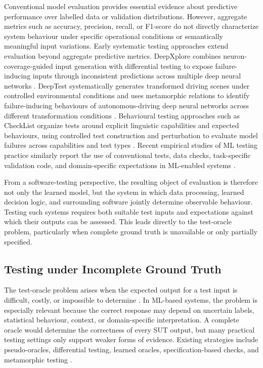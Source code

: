 \documentclass[preprint,12pt]{elsarticle}
\begin{document}
Conventional model evaluation provides essential evidence about predictive
performance over labelled data or validation distributions. However, aggregate
metrics such as accuracy, precision, recall, or F1-score do not directly
characterize system behaviour under specific operational conditions or
semantically meaningful input variations. Early systematic testing approaches
extend evaluation beyond aggregate predictive metrics. DeepXplore combines
neuron-coverage-guided input generation with differential testing to expose
failure-inducing inputs through inconsistent predictions across multiple deep
neural networks \cite{pei2017deepxplore}. DeepTest systematically generates
transformed driving scenes under controlled environmental conditions and uses
metamorphic relations to identify failure-inducing behaviours of
autonomous-driving deep neural networks across different transformation
conditions \cite{tian2018deeptest}. Behavioural testing approaches such as
CheckList organize tests around explicit linguistic capabilities and expected
behaviours, using controlled test construction and perturbation to evaluate
model failures across capabilities and test types
\cite{ribeiro2020checklist}. Recent empirical studies of ML testing practice
similarly report the use of conventional tests, data checks, task-specific
validation code, and domain-specific expectations in ML-enabled systems
\cite{openja2024mlTestingWild,cannavale2026mlTestingPractice}.

From a software-testing perspective, the resulting object of evaluation is
therefore not only the learned model, but the system in which data processing,
learned decision logic, and surrounding software jointly determine observable
behaviour. Testing such systems requires both suitable test inputs and
expectations against which their outputs can be assessed. This leads directly
to the test-oracle problem, particularly when complete ground truth is
unavailable or only partially specified.


\subsection{Testing under Incomplete Ground Truth}

The test-oracle problem arises when the expected output for a test input is
difficult, costly, or impossible to determine \cite{barr2015oracle}. In
ML-based systems, the problem is especially relevant because the correct
response may depend on uncertain labels, statistical behaviour, context, or
domain-specific interpretation. A complete oracle would determine the
correctness of every SUT output, but many practical testing settings only
support weaker forms of evidence. Existing strategies include pseudo-oracles,
differential testing, learned oracles, specification-based checks, and
metamorphic testing \cite{fontes2021oracles,segura2016metamorphic}.
\end{document}
